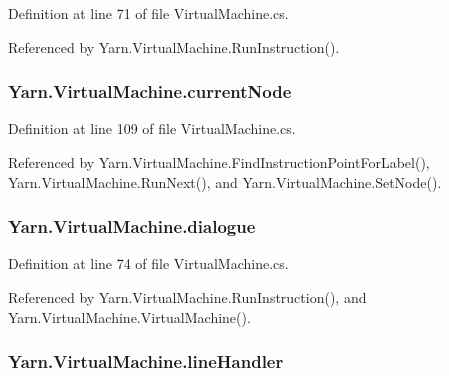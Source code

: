 Definition at line 71 of file Virtual\-Machine.\-cs.



Referenced by Yarn.\-Virtual\-Machine.\-Run\-Instruction().

\hypertarget{a00152_ab7594e14981ad75cecea3b2e7dcf895c}{
\subsubsection[{current\-Node}]{ Yarn.\-Virtual\-Machine.\-current\-Node\hspace{0.3cm}{\ttfamily [private]}}}\label{a00152_ab7594e14981ad75cecea3b2e7dcf895c}


Definition at line 109 of file Virtual\-Machine.\-cs.



Referenced by Yarn.\-Virtual\-Machine.\-Find\-Instruction\-Point\-For\-Label(), Yarn.\-Virtual\-Machine.\-Run\-Next(), and Yarn.\-Virtual\-Machine.\-Set\-Node().

\hypertarget{a00152_ac506426c503da5f033247c29e11c5e82}{
\subsubsection[{dialogue}]{ Yarn.\-Virtual\-Machine.\-dialogue\hspace{0.3cm}{\ttfamily [private]}}}\label{a00152_ac506426c503da5f033247c29e11c5e82}


Definition at line 74 of file Virtual\-Machine.\-cs.



Referenced by Yarn.\-Virtual\-Machine.\-Run\-Instruction(), and Yarn.\-Virtual\-Machine.\-Virtual\-Machine().

\hypertarget{a00152_a29b30454f068fc7e107d48bff4346fd9}{
\subsubsection[{line\-Handler}]{ Yarn.\-Virtual\-Machine.\-line\-Handler}}\label{a00152_a29b30454f068fc7e107d48bff4346fd9}



